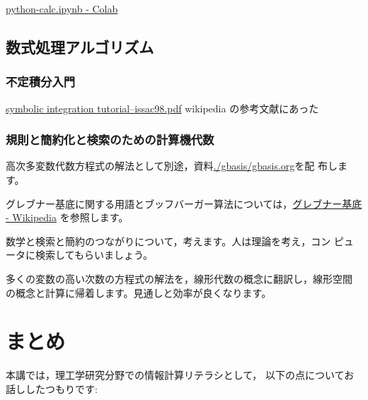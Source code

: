 \documentclass[dvipdfmx,11pat]{jarticle}
\begin{document}
\href{https://colab.research.google.com/drive/13-xrzx125aD3L4mzB5BhOHAUyLeV6kCX}{python-calc.ipynb - Colab} 
\subsection{数式処理アルゴリズム}
\label{sec:org9209abe}
\subsubsection{不定積分入門}
\label{sec:org6d2e4ce}
\href{http://www-sop.inria.fr/cafe/Manuel.Bronstein/publications/issac98.pdf}{symbolic integration tutorial--issac98.pdf}
wikipedia の参考文献にあった
\subsubsection{規則と簡約化と検索のための計算機代数}
\label{sec:orge453cd0}

高次多変数代数方程式の解法として別途，資料\url{./gbasis/gbasis.org}を配
布します。

グレブナー基底に関する用語とブッフバーガー算法については，\href{https://ja.wikipedia.org/wiki/\%E3\%82\%B0\%E3\%83\%AC\%E3\%83\%96\%E3\%83\%8A\%E3\%83\%BC\%E5\%9F\%BA\%E5\%BA\%95}{グレブナー基底 - Wikipedia} 
を参照します。

数学と検索と簡約のつながりについて，考えます。人は理論を考え，コン
ピュータに検索してもらいましょう。

多くの変数の高い次数の方程式の解法を，線形代数の概念に翻訳し，線形空間
の概念と計算に帰着します。見通しと効率が良くなります。
\section{まとめ}
\label{sec:org1641741}
本講では，理工学研究分野での情報計算リテラシとして，
以下の点についてお話ししたつもりです:
\end{document}
